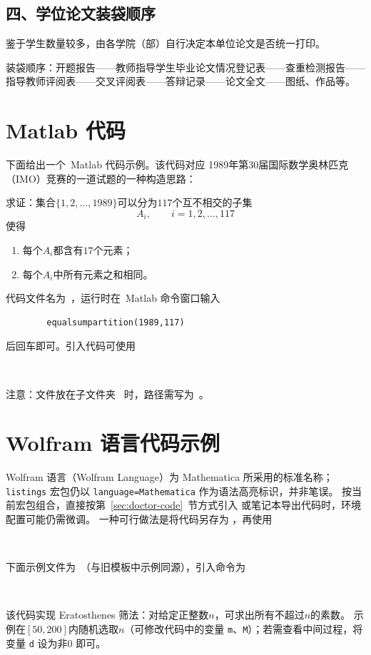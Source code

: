 \section*{四、学位论文装袋顺序}
鉴于学生数量较多，由各学院（部）自行决定本单位论文是否统一打印。

装袋顺序：开题报告——教师指导学生毕业论文情况登记表——查重检测报告——指导教师评阅表——交叉评阅表——答辩记录——论文全文——图纸、作品等。

\chapter{Matlab 代码}\label{app:code-matlab}
下面给出一个~Matlab 代码示例。该代码对应
1989年第30届国际数学奥林匹克（IMO）竞赛的一道试题的一种构造思路：\vspace{.5cm}

\noindent 求证：集合$\{1, 2, \ldots, 1989\}$可以分为$117$个互不相交的子集
\[A_i, \qquad i = 1, 2, \ldots, 117\]
使得
\begin{enumerate}[label=\arabic*., leftmargin=2em]
    \item 每个$A_i$都含有$17$个元素；
    \item 每个$A_i$中所有元素之和相同。
\end{enumerate}

代码文件名为~，运行时在~Matlab 命令窗口输入
\begin{verbatim}
        equalsumpartition(1989,117)
\end{verbatim}
后回车即可。引入代码可使用
\begin{verbatim}
       
\end{verbatim}
注意：文件放在子文件夹~ 时，路径需写为~。



\chapter{Wolfram 语言代码示例}\label{app:code-wolfram}
Wolfram 语言（Wolfram Language）为 Mathematica 所采用的标准名称；\texttt{listings} 宏包仍以
\texttt{language=Mathematica} 作为语法高亮标识，并非笔误。
按当前宏包组合，直接按第~\ref{sec:doctor-code}~节方式引入  或笔记本导出代码时，环境配置可能仍需微调。
一种可行做法是将代码另存为 ，再使用
\begin{verbatim}
        
\end{verbatim}
下面示例文件为~（与旧模板中示例同源），引入命令为
\begin{verbatim}
       
\end{verbatim}
该代码实现 Eratosthenes 筛法：对给定正整数$n$，可求出所有不超过$n$的素数。
示例在$[50,200]$内随机选取$n$（可修改代码中的变量 \texttt{m}、\texttt{M}）；若需查看中间过程，将变量 \texttt{d} 设为非$0$ 即可。


